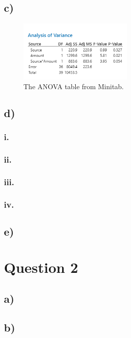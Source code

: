 \documentclass{article}
\begin{document}
\subsection*{c)}
\begin{figure}[h]
    \centering
    \includegraphics[width=0.5\textwidth]{./images/1_c.png}
    \caption{The ANOVA table from Minitab.}
    \label{fig:1_c}
  \end{figure}

\subsection*{d)}
\subsubsection*{i.}
\subsubsection*{ii.}
\subsubsection*{iii.}
\subsubsection*{iv.}
\subsection*{e)}

\section*{Question 2}
\subsection*{a)}
\subsection*{b)}
\end{document}
